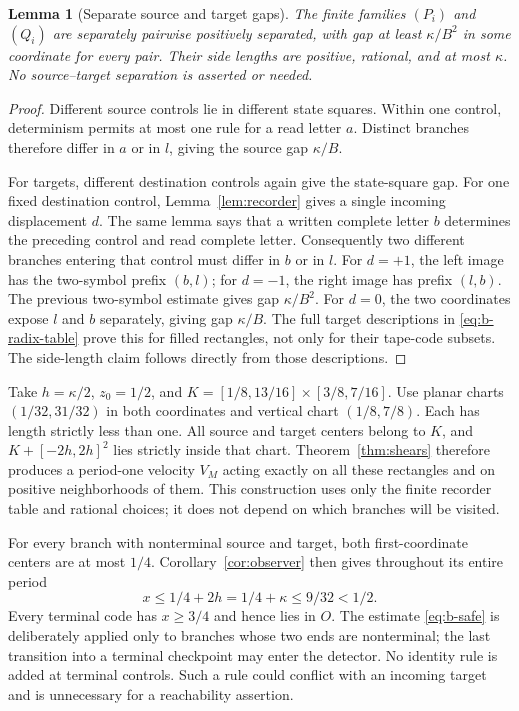 \documentclass[11pt]{article}
\newtheorem{lemma}[theorem]{Lemma}
\theoremstyle{remark}
\begin{document}
\begin{lemma}[Separate source and target gaps]\label{lem:b-gap}
The finite families $(P_i)$ and $(Q_i)$ are separately pairwise positively
separated, with gap at least $\kappa/B^2$ in some coordinate for every pair.
Their side lengths are positive, rational, and at most $\kappa$.
No source--target separation is asserted or needed.
\end{lemma}
\begin{proof}
Different source controls lie in different state squares. Within one
control, determinism permits at most one rule for a read letter $a$.
Distinct branches therefore differ in $a$ or in $l$, giving the source gap
$\kappa/B$.

For targets, different destination controls again give the state-square
gap. For one fixed destination control, Lemma~\ref{lem:recorder} gives a
single incoming displacement $d$. The same lemma says that a written
complete letter $b$ determines the preceding control and read complete
letter. Consequently two different branches entering that control must
differ in $b$ or in $l$. For $d=+1$, the left image has the two-symbol
prefix $(b,l)$; for $d=-1$, the right image has prefix $(l,b)$. The
previous two-symbol estimate gives gap $\kappa/B^2$. For $d=0$, the two
coordinates expose $l$ and $b$ separately, giving gap $\kappa/B$.
The full target descriptions in \eqref{eq:b-radix-table} prove this for
filled rectangles, not only for their tape-code subsets. The side-length
claim follows directly from those descriptions.
\end{proof}

Take $h=\kappa/2$, $z_0=1/2$, and
$K=[1/8,13/16]\times[3/8,7/16]$. Use planar charts
$(1/32,31/32)$ in both coordinates and vertical chart $(1/8,7/8)$.
Each has length strictly less than one.
All source and target centers belong to $K$, and
$K+[-2h,2h]^2$ lies strictly inside that chart. Theorem~\ref{thm:shears}
therefore produces a period-one velocity $V_M$ acting exactly on all these
rectangles and on positive neighborhoods of them. This construction uses
only the finite recorder table and rational choices; it does not depend on
which branches will be visited.

For every branch with nonterminal source and target, both first-coordinate
centers are at most $1/4$. Corollary~\ref{cor:observer} then gives throughout
its entire period
\begin{equation}\label{eq:b-safe}
 x\le1/4+2h=1/4+\kappa\le9/32<1/2.
\end{equation}
Every terminal code has $x\ge3/4$ and hence lies in $O$.
The estimate \eqref{eq:b-safe} is deliberately applied only to branches
whose two ends are nonterminal; the last transition into a terminal
checkpoint may enter the detector. No identity rule is added at terminal
controls. Such a rule could conflict with an incoming target and is
unnecessary for a reachability assertion.
\end{document}
